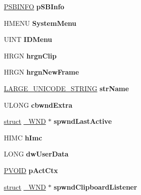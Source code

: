 \begin{DoxyCompactItemize}
\hyperlink{structtag_s_b_i_n_f_o}{P\+S\+B\+I\+N\+FO} {\bfseries p\+S\+B\+Info}
\item 
\mbox{\label{struct___w_n_d_aa9c00a41fedaeb524fee720a6b382320}} 
H\+M\+E\+NU {\bfseries System\+Menu}
\item 
\mbox{\label{struct___w_n_d_a53478ae150ed453c0aa09b2d6d9a6db9}} 
U\+I\+NT {\bfseries I\+D\+Menu}
\item 
\mbox{\label{struct___w_n_d_a0b69ecba8a25338f5db19b088a83c67c}} 
H\+R\+GN {\bfseries hrgn\+Clip}
\item 
\mbox{\label{struct___w_n_d_a6b7cfe2a4263590612c644ccc0639edf}} 
H\+R\+GN {\bfseries hrgn\+New\+Frame}
\item 
\mbox{\label{struct___w_n_d_ab79f82f4205b2d30470654798191dcbc}} 
\hyperlink{struct___l_a_r_g_e___u_n_i_c_o_d_e___s_t_r_i_n_g}{L\+A\+R\+G\+E\+\_\+\+U\+N\+I\+C\+O\+D\+E\+\_\+\+S\+T\+R\+I\+NG} {\bfseries str\+Name}
\item 
\mbox{\label{struct___w_n_d_af845b33c55d5b759d12f5c99c94de8b9}} 
U\+L\+O\+NG {\bfseries cbwnd\+Extra}
\item 
\mbox{\label{struct___w_n_d_a4405ad53757816383606cad6db343139}} 
\hyperlink{interfacestruct}{struct} \hyperlink{struct___w_n_d}{\+\_\+\+W\+ND} $\ast$ {\bfseries spwnd\+Last\+Active}
\item 
\mbox{\label{struct___w_n_d_aace61b0a5233510b1c3163ca551bd1f1}} 
H\+I\+MC {\bfseries h\+Imc}
\item 
\mbox{\label{struct___w_n_d_a510b8a419dd5e3e48c1d9a2e2388b835}} 
L\+O\+NG {\bfseries dw\+User\+Data}
\item 
\mbox{\label{struct___w_n_d_a59fd6d87d25968bb9cb70c3ecd0ee737}} 
\hyperlink{interfacevoid}{P\+V\+O\+ID} {\bfseries p\+Act\+Ctx}
\item 
\mbox{\label{struct___w_n_d_ae0484f90f2d44b57ed7198d792208c13}} 
\hyperlink{interfacestruct}{struct} \hyperlink{struct___w_n_d}{\+\_\+\+W\+ND} $\ast$ {\bfseries spwnd\+Clipboard\+Listener}

\end{DoxyCompactItemize}
